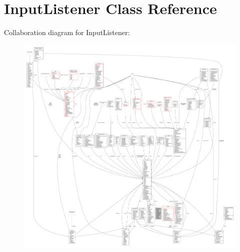 \hypertarget{classInputListener}{}\section{Input\+Listener Class Reference}
\label{classInputListener}


Collaboration diagram for Input\+Listener\+:
\nopagebreak
\begin{figure}[H]
\begin{center}
\leavevmode
\includegraphics[width=350pt]{d6/d20/classInputListener__coll__graph}
\end{center}
\end{figure}
